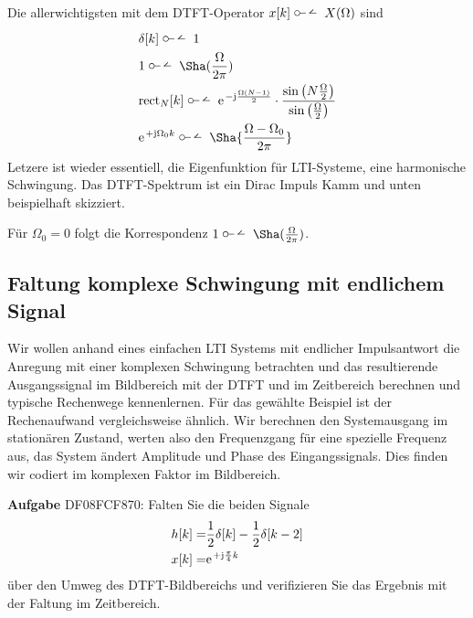 Die allerwichtigsten mit dem DTFT-Operator $x[k]\dtft X(\Omega)$
sind
\begin{align}
&\delta[k] \dtft 1\\
&1 \dtft \Sha(\frac{\Omega}{2\pi})\\
&\mathrm{rect}_N[k]
\dtft
\e^{-\im\frac{\Omega(N-1)}{2}}\cdot\frac{\sin\left(N\frac{\Omega}{2}\right)}{\sin\left(\frac{\Omega}{2}\right)}\\
&\e^{+\im \Omega_0 k} \dtft \Sha{\frac{\Omega-\Omega_0}{2\pi}}
\end{align}
Letzere ist wieder essentiell, die Eigenfunktion für LTI-Systeme, eine harmonische
Schwingung. Das DTFT-Spektrum ist ein Dirac Impuls Kamm und unten beispielhaft skizziert.
%
\begin{center}
\end{center}
Für $\Omega_0=0$ folgt die Korrespondenz $1 \dtft \Sha(\frac{\Omega}{2\pi})$.

\newpage
\subsection{Faltung komplexe Schwingung mit endlichem Signal}
\label{sec:DF08FCF870}
\begin{Ziel}
Wir wollen anhand eines einfachen LTI Systems mit endlicher Impulsantwort
die Anregung mit einer komplexen Schwingung betrachten und das resultierende
Ausgangssignal im Bildbereich mit der DTFT und im Zeitbereich berechnen und
typische Rechenwege kennenlernen. Für das gewählte
Beispiel ist der Rechenaufwand vergleichsweise ähnlich.
%
Wir berechnen den Systemausgang im stationären Zustand, werten also den Frequenzgang
für eine spezielle Frequenz aus, das System ändert Amplitude und Phase des
Eingangssignals. Dies finden wir codiert im komplexen Faktor im Bildbereich.
\end{Ziel}
\textbf{Aufgabe} {\tiny DF08FCF870}: Falten Sie die beiden Signale
\begin{align}
h[k] =& \frac{1}{2}\delta[k] - \frac{1}{2}\delta[k-2]\\
x[k] =& \e^{+\im \frac{\pi}{4} k}
\end{align}
über den Umweg des DTFT-Bildbereichs und verifizieren Sie das Ergebnis
mit der Faltung im Zeitbereich.

